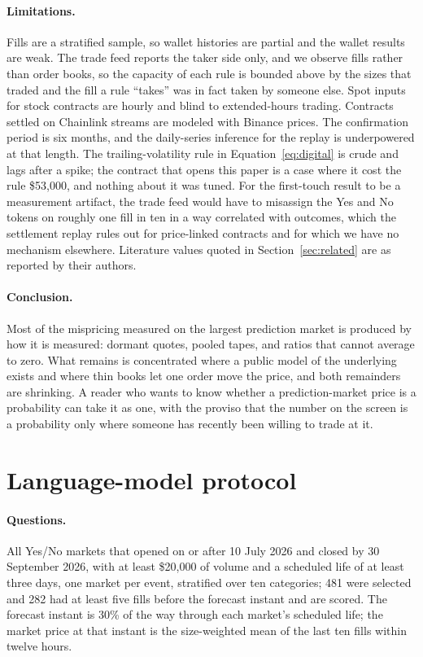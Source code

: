 \documentclass[format=acmsmall, review=false]{acmart}
\begin{document}
\paragraph{Limitations.} Fills are a stratified sample, so wallet histories are partial and the wallet results are weak. The trade feed reports the taker side only, and we observe fills rather than order books, so the capacity of each rule is bounded above by the sizes that traded and the fill a rule ``takes'' was in fact taken by someone else. Spot inputs for stock contracts are hourly and blind to extended-hours trading. Contracts settled on Chainlink streams are modeled with Binance prices. The confirmation period is six months, and the daily-series inference for the replay is underpowered at that length. The trailing-volatility rule in Equation~\ref{eq:digital} is crude and lags after a spike; the contract that opens this paper is a case where it cost the rule \$53,000, and nothing about it was tuned. For the first-touch result to be a measurement artifact, the trade feed would have to misassign the Yes and No tokens on roughly one fill in ten in a way correlated with outcomes, which the settlement replay rules out for price-linked contracts and for which we have no mechanism elsewhere. Literature values quoted in Section~\ref{sec:related} are as reported by their authors.

\paragraph{Conclusion.} Most of the mispricing measured on the largest prediction market is produced by how it is measured: dormant quotes, pooled tapes, and ratios that cannot average to zero. What remains is concentrated where a public model of the underlying exists and where thin books let one order move the price, and both remainders are shrinking. A reader who wants to know whether a prediction-market price is a probability can take it as one, with the proviso that the number on the screen is a probability only where someone has recently been willing to trade at it.




\appendix

\section{Language-model protocol}\label{app:llm}

\paragraph{Questions.} All Yes/No markets that opened on or after 10 July 2026 and closed by 30 September 2026, with at least \$20,000 of volume and a scheduled life of at least three days, one market per event, stratified over ten categories; 481 were selected and 282 had at least five fills before the forecast instant and are scored. The forecast instant is 30\% of the way through each market's scheduled life; the market price at that instant is the size-weighted mean of the last ten fills within twelve hours.
\end{document}
